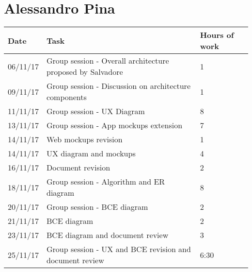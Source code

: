 \section{Alessandro Pina}
\begin{table}[H]
	\begin{tabular}{ p{2cm} p{10cm} p{3cm}}
	Date & Task & Hours of work\\
	\hline
	06/11/17 & Group session - Overall architecture proposed by Salvadore & 1 \\
	09/11/17 & Group session - Discussion on architecture components & 1 \\
	11/11/17 & Group session - UX Diagram & 8 \\
	13/11/17 & Group session - App mockups extension & 7 \\
	14/11/17 & Web mockups revision & 1 \\
	14/11/17 & UX diagram and mockups & 4 \\
	16/11/17 & Document revision & 2 \\
	18/11/17 & Group session - Algorithm and ER diagram & 8 \\
	20/11/17 & Group session - BCE diagram & 2 \\
	21/11/17 & BCE diagram & 2 \\
	23/11/17 & BCE diagram and document review & 3 \\
	25/11/17 & Group session - UX and BCE revision and document review & 6:30 \\
	\end{tabular}
\end{table}


